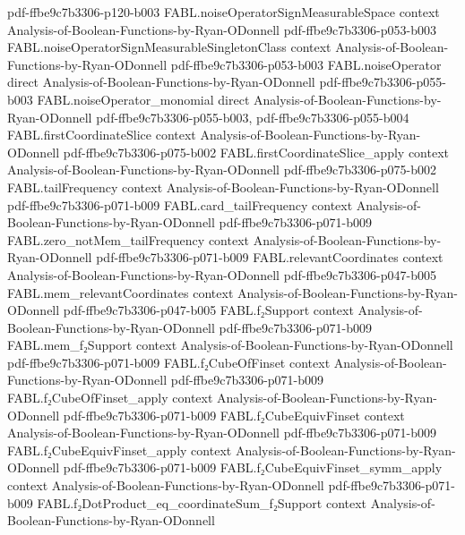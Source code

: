 \begin{theorem}
  {pdf-ffbe9c7b3306-p120-b003}
\proofstep
  {FABL.noiseOperatorSignMeasurableSpace}
  {context}
  {Analysis-of-Boolean-Functions-by-Ryan-ODonnell}
  {pdf-ffbe9c7b3306-p053-b003}
\proofstep
  {FABL.noiseOperatorSignMeasurableSingletonClass}
  {context}
  {Analysis-of-Boolean-Functions-by-Ryan-ODonnell}
  {pdf-ffbe9c7b3306-p053-b003}
\proofstep
  {FABL.noiseOperator}
  {direct}
  {Analysis-of-Boolean-Functions-by-Ryan-ODonnell}
  {pdf-ffbe9c7b3306-p055-b003}
\proofstep
  {FABL.noiseOperator_monomial}
  {direct}
  {Analysis-of-Boolean-Functions-by-Ryan-ODonnell}
  {pdf-ffbe9c7b3306-p055-b003,
    pdf-ffbe9c7b3306-p055-b004}
\proofstep
  {FABL.firstCoordinateSlice}
  {context}
  {Analysis-of-Boolean-Functions-by-Ryan-ODonnell}
  {pdf-ffbe9c7b3306-p075-b002}
\proofstep
  {FABL.firstCoordinateSlice_apply}
  {context}
  {Analysis-of-Boolean-Functions-by-Ryan-ODonnell}
  {pdf-ffbe9c7b3306-p075-b002}
\proofstep
  {FABL.tailFrequency}
  {context}
  {Analysis-of-Boolean-Functions-by-Ryan-ODonnell}
  {pdf-ffbe9c7b3306-p071-b009}
\proofstep
  {FABL.card_tailFrequency}
  {context}
  {Analysis-of-Boolean-Functions-by-Ryan-ODonnell}
  {pdf-ffbe9c7b3306-p071-b009}
\proofstep
  {FABL.zero_notMem_tailFrequency}
  {context}
  {Analysis-of-Boolean-Functions-by-Ryan-ODonnell}
  {pdf-ffbe9c7b3306-p071-b009}
\proofstep
  {FABL.relevantCoordinates}
  {context}
  {Analysis-of-Boolean-Functions-by-Ryan-ODonnell}
  {pdf-ffbe9c7b3306-p047-b005}
\proofstep
  {FABL.mem_relevantCoordinates}
  {context}
  {Analysis-of-Boolean-Functions-by-Ryan-ODonnell}
  {pdf-ffbe9c7b3306-p047-b005}
\proofstep
  {FABL.f₂Support}
  {context}
  {Analysis-of-Boolean-Functions-by-Ryan-ODonnell}
  {pdf-ffbe9c7b3306-p071-b009}
\proofstep
  {FABL.mem_f₂Support}
  {context}
  {Analysis-of-Boolean-Functions-by-Ryan-ODonnell}
  {pdf-ffbe9c7b3306-p071-b009}
\proofstep
  {FABL.f₂CubeOfFinset}
  {context}
  {Analysis-of-Boolean-Functions-by-Ryan-ODonnell}
  {pdf-ffbe9c7b3306-p071-b009}
\proofstep
  {FABL.f₂CubeOfFinset_apply}
  {context}
  {Analysis-of-Boolean-Functions-by-Ryan-ODonnell}
  {pdf-ffbe9c7b3306-p071-b009}
\proofstep
  {FABL.f₂CubeEquivFinset}
  {context}
  {Analysis-of-Boolean-Functions-by-Ryan-ODonnell}
  {pdf-ffbe9c7b3306-p071-b009}
\proofstep
  {FABL.f₂CubeEquivFinset_apply}
  {context}
  {Analysis-of-Boolean-Functions-by-Ryan-ODonnell}
  {pdf-ffbe9c7b3306-p071-b009}
\proofstep
  {FABL.f₂CubeEquivFinset_symm_apply}
  {context}
  {Analysis-of-Boolean-Functions-by-Ryan-ODonnell}
  {pdf-ffbe9c7b3306-p071-b009}
\proofstep
  {FABL.f₂DotProduct_eq_coordinateSum_f₂Support}
  {context}
  {Analysis-of-Boolean-Functions-by-Ryan-ODonnell}

\end{theorem}
